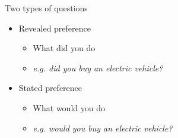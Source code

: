 \documentclass[aspectratio=169]{beamer}
\begin{document}



\begin{frame}

Two types of questions

\vspace{2mm}

	\begin{itemize}
		
		\item Revealed preference
		\begin{itemize}
			\item What did you do
			\item \textit{e.g. did you buy an electric vehicle?}
		\end{itemize}
		
		\item Stated preference
		\begin{itemize}
			\item What would you do
			\item \textit{e.g. would you buy an electric vehicle?}
		\end{itemize}
		
	\end{itemize}
	
	
\end{frame}












\begin{frame}
	
	
	
\end{frame}
\end{document}
